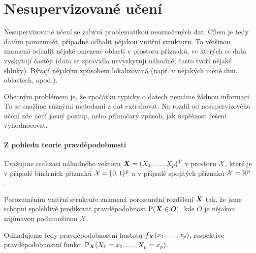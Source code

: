 \documentclass[../main.tex]{subfiles}
\begin{document}
\section{Nesupervizované učení}

Nesupervizované učení se zabývá problematikou neoznačených dat. Cílem je tedy datům porozumět, případně odhalit nějakou vnitřní strukturu. To většinou znamená odhalit nějaké omezené oblasti v prostoru příznaků, ve kterých se data vyskytují častěji (data se zpravidla nevyskytují náhodně, často tvoří nějaké shluky). Bývají nějakým způsobem lokalizovaná (např. v nějakých méně dim. oblastech, apod.).

Obecným problémem je, že zpočátku typicky o datech nemáme žádnou informaci. Tu se snažíme různými metodami z dat extrahovat. Na rozdíl od nesupervizového učení zde není jasný postup, nebo přímočarý způsob, jak úspěšnost řešení vyhodnocovat.

\paragraph{Z pohledu teorie pravděpodobnosti} Uvažujme realizaci náhodného vektoru $\bm{X} = (X_1, \ldots, X_p)^T$ v prostoru $\mathcal{X}$, které je v případě binárních příznaků $\mathcal{X} = \{0,1\}^p$ a v případě spojitých příznaků $\mathcal{X} = \mathbb{R}^p$.

Porozuměním vnitřní struktuře znamená porozumění rozdělení $\bm{X}$ tak, že jsme schopni spolehlivě predikovat pravděpodobnost $\text{P}(\bm{X} \in O)$, kde $O$ je nějakou zajímavou podmnožinou $\mathcal{X}$.

Odhadujeme tedy pravděpodobnostní hustotu $f_{\bm{X}}(x_1, \ldots, x_p)$, respektive pravděpodobnostní funkci $\text{P}_{\bm{X}}(X_1 = x_1, \ldots, X_p = x_p)$.
\end{document}
